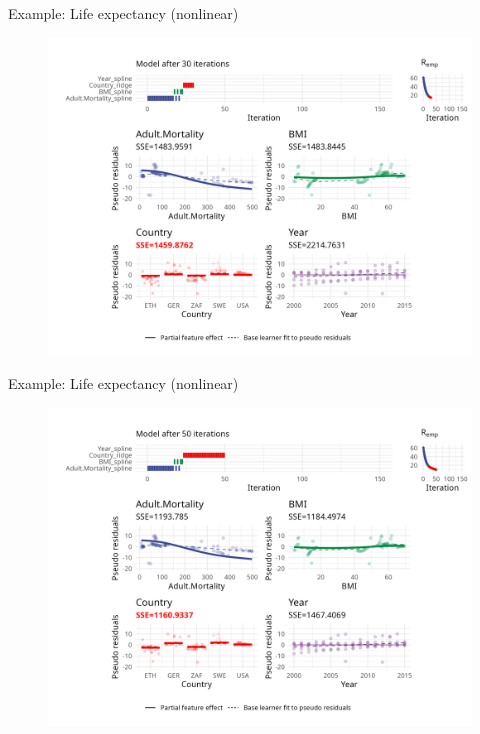 \begin{frame}{Example: Life expectancy (nonlinear)}
	\begin{figure}
		\centering
		\includegraphics[width=\textwidth]{figure/cwb-anim-nl/fig-iter-0030.png}
	\end{figure}
	\addtocounter{framenumber}{-1}
\end{frame}


\begin{frame}{Example: Life expectancy (nonlinear)}
	\begin{figure}
		\centering
		\includegraphics[width=\textwidth]{figure/cwb-anim-nl/fig-iter-0050.png}
	\end{figure}
	\addtocounter{framenumber}{-1}
\end{frame}


